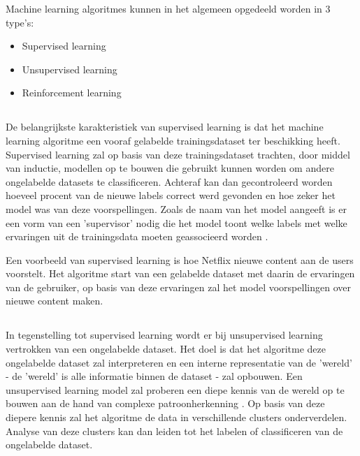 Machine learning algoritmes kunnen in het algemeen opgedeeld worden in 3 type's:
\begin{itemize}
    \item Supervised learning
    \item Unsupervised learning
    \item Reinforcement learning
\end{itemize}

\subsection{}
\label{sec:supervised-learning}
De belangrijkste karakteristiek van supervised learning is dat het machine learning algoritme een vooraf gelabelde trainingsdataset ter beschikking heeft. Supervised learning zal op basis van deze trainingsdataset trachten, door middel van inductie, modellen op te bouwen die gebruikt kunnen worden om andere ongelabelde datasets te classificeren. Achteraf kan dan gecontroleerd worden hoeveel procent van de nieuwe labels correct werd gevonden en hoe zeker het model was van deze voorspellingen. Zoals de naam van het model aangeeft is er een vorm van een 'supervisor' nodig die het model toont welke labels met welke ervaringen uit de trainingsdata moeten geassocieerd worden \autocite{Cunningham2008}. 

Een voorbeeld van supervised learning is hoe Netflix nieuwe content aan de users voorstelt. Het algoritme start van een gelabelde dataset met daarin de ervaringen van de gebruiker, op basis van deze ervaringen zal het model voorspellingen over nieuwe content maken.

\subsection{}
\label{sec:unsupervised-learning}
In tegenstelling tot supervised learning wordt er bij unsupervised learning vertrokken van een ongelabelde dataset. Het doel is dat het algoritme deze ongelabelde dataset zal interpreteren en een interne representatie van de 'wereld' - de 'wereld' is alle informatie binnen de dataset - zal opbouwen. Een unsupervised learning model zal proberen een diepe kennis van de wereld op te bouwen aan de hand van complexe patroonherkenning \autocite{Hinton1999}. Op basis van deze diepere kennis zal het algoritme de data in verschillende clusters onderverdelen. Analyse van deze clusters kan dan leiden tot het labelen of classificeren van de ongelabelde dataset.

